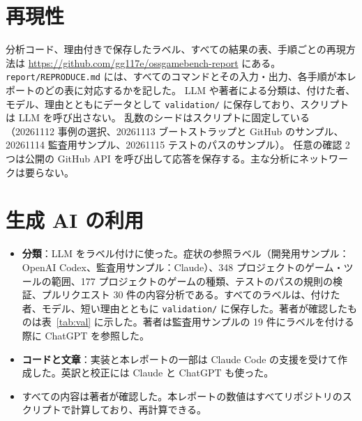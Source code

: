 \documentclass[a4paper,twocolumn,9pt]{ltjsarticle}
\begin{document}
\appendix
\section{再現性}

分析コード、理由付きで保存したラベル、すべての結果の表、手順ごとの再現方法は \url{https://github.com/gg117e/ossgamebench-report} にある。
\texttt{report/REPRODUCE.md} には、すべてのコマンドとその入力・出力、各手順が本レポートのどの表に対応するかを記した。
LLM や著者による分類は、付けた者、モデル、理由とともにデータとして \texttt{validation/} に保存しており、スクリプトは LLM を呼び出さない。
乱数のシードはスクリプトに固定している（20261112 事例の選択、20261113 ブートストラップと GitHub のサンプル、20261114 監査用サンプル、20261115 テストのパスのサンプル）。
任意の確認 2 つは公開の GitHub API を呼び出して応答を保存する。主な分析にネットワークは要らない。

\section{生成 AI の利用}

\begin{itemize}
\item \textbf{分類}：LLM をラベル付けに使った。症状の参照ラベル（開発用サンプル：OpenAI Codex、監査用サンプル：Claude）、348 プロジェクトのゲーム・ツールの範囲、177 プロジェクトのゲームの種類、テストのパスの規則の検証、プルリクエスト 30 件の内容分析である。すべてのラベルは、付けた者、モデル、短い理由とともに \texttt{validation/} に保存した。著者が確認したものは表~\ref{tab:val} に示した。著者は監査用サンプルの 19 件にラベルを付ける際に ChatGPT を参照した。
\item \textbf{コードと文章}：実装と本レポートの一部は Claude Code の支援を受けて作成した。英訳と校正には Claude と ChatGPT も使った。
\item すべての内容は著者が確認した。本レポートの数値はすべてリポジトリのスクリプトで計算しており、再計算できる。
\end{itemize}
\end{document}

